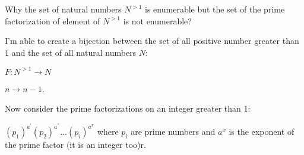 Why the set of natural numbers $N^{>1}$ is enumerable but the set of the prime factorization of element of $N^{>1}$ is not enumerable?

I'm able to create a bijection between the set of all positive number greater than $1$ and the set of all natural numbers $N$: 

$F: N^{>1} \to N$

$n \to n-1$.

Now consider the prime factorizations on an integer greater than 1:

$(p_{1})^{a^{'}}(p_{2})^{a^{''}}...(p_{i})^{a^{x}}$ where $p_{i}$ are prime numbers and $a^{x}$ is the exponent of the prime factor (it is an integer too)r.